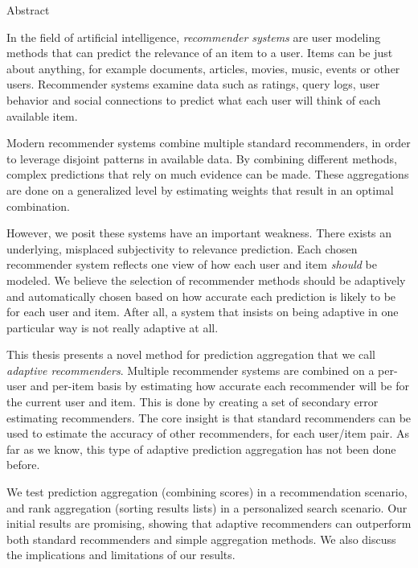 \null\vspace{2em}
{
  \centering
  \normalfont
  \huge
  \noindent
  Abstract\\
}
\vspace{2em}

\noindent
In the field of artificial intelligence,
\emph{recommender systems} are user modeling methods
that can predict the relevance of an item to a user.
Items can be just about anything, for example 
documents, articles, movies, music, events or other users.
Recommender systems examine data such as ratings, query logs,
user behavior and social connections to predict
what each user will think of each available item.

Modern recommender systems
combine multiple standard recommenders,
in order to leverage disjoint patterns in available data.
By combining different methods,
complex predictions that rely on much evidence can be made.
These aggregations are done on a generalized level
by estimating weights that result in an optimal combination.

However, we posit these systems have an important weakness.
There exists an underlying, misplaced subjectivity to relevance prediction.
Each chosen recommender system reflects one view of 
how each user and item \emph{should} be modeled.
We believe the selection of recommender methods should 
be adaptively and automatically chosen based on
how accurate each prediction is likely to be for each user and item.
After all, a system that insists on being adaptive
in one particular way is not really adaptive at all.

This thesis presents a novel method for prediction aggregation
that we call \emph{adaptive recommenders}.
Multiple recommender systems are combined on a per-user and per-item basis
by estimating how accurate each recommender will be for the current user and item.
This is done by creating a set of secondary error estimating recommenders.
The core insight is that standard recommenders can be used
to estimate the accuracy of other recommenders, for each
user/item pair.
As far as we know, this type of adaptive prediction aggregation
has not been done before.

We test prediction aggregation (combining scores) in a
recommendation scenario,
and rank aggregation (sorting results lists) in a personalized search scenario.
Our initial results are promising, showing that adaptive recommenders
can outperform both standard recommenders and simple aggregation methods.
We also discuss the implications and limitations of our results.

\cleardoublepage
